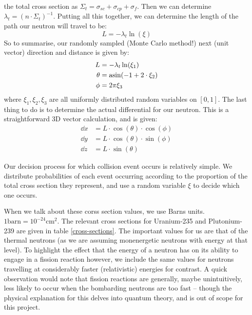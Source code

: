 the total cross section as $\Sigma_t = \sigma_{sc} + \sigma_{cp} + \sigma_{f}$. Then we can determine $\lambda_t = (n \cdot \Sigma_t)^{-1}$.
Putting all this together, we can determine the length of the path our neutron will travel to be:
$$L = -\lambda_t \ln(\xi)$$
So to summarise, our randomly sampled (Monte Carlo method!) next (unit vector) direction and distance is given by:
\begin{align*}
    L &= -\lambda_t \ln(\xi_1) \\
    \theta &= \asin(-1 + 2 \cdot \xi_2) \\
    \phi &= 2 \pi \xi_3
\end{align*}
where $\xi_1, \xi_2, \xi_3$ are all uniformly distributed random variables on $[0,1]$. The last thing to do is to determine the actual 
differential for our neutron. This is a straightforward 3D vector calculation, and is given:
\begin{align*}
    \dd x &= L \cdot \cos(\theta) \cdot \cos(\phi) \\
    \dd y &= L \cdot \cos(\theta) \cdot \sin(\phi) \\
    \dd z &= L \cdot \sin(\theta) 
\end{align*}

Our decision process for which collision event occurs is relatively simple. We distribute probabilities of each event occurring 
according to the proportion of the total cross section they represent, and use a random variable $\xi$ to decide which one 
occurs.

When we talk about these corss section values, we use Barns units. $1 \text{barn} = 10^{-24}\text{cm}^2$. The relevant cross 
sections for Uranium-235 and Plutonium-239 are given in table \ref{cross-sections}. The important values 
for us are that of the thermal neutrons (as we are assuming monenergetic neutrons with energy at that level). 
To highlight the effect that the energy of a neutron has on its ability to engage in a fission reaction however, 
we include the same values for neutrons travelling at considerably faster (relativistic) energies for contrast. A 
quick observation would note that fission reactions are generally, maybe unintuitively, less likely to occur when the bombarding 
neutrons are too fast -- though the physical explanation for this delves into quantum theory, and is out of scope for this project.

